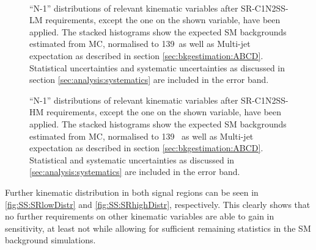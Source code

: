 \begin{figure}[!htpb]
\centering
  \\
  \caption{``N-1'' distributions of relevant kinematic variables after SR-C1N2SS-LM requirements, except the one on the
shown variable, have been applied.
The stacked histograms show the expected SM backgrounds estimated from \ac{MC}, normalised to 139~\ifb as well as Multi-jet expectation as described in section \ref{sec:bkgestimation:ABCD}.
\label{fig:SS:SRlowmass}Statistical uncertainties and systematic uncertainties as discussed in section \ref{sec:analysis:systematics} are included in the error band. }
\end{figure}

\begin{figure}[!htpb]
\centering
{}
  \caption{``N-1'' distributions of relevant kinematic variables after SR-C1N2SS-HM requirements, except the one on the
shown variable, have been applied. The stacked histograms show the expected \ac{SM} backgrounds estimated from \ac{MC}, normalised to 139 ~\ifb as well as Multi-jet expectation as described in section \ref{sec:bkgestimation:ABCD}. Statistical and systematic uncertainties as discussed in \ref{sec:analysis:systematics} are included in the error band. 
\label{fig:SS:SRhighmass} }
\end{figure}

Further kinematic distribution in both signal regions can be seen in \ref{fig:SS:SRlowDistr} and \ref{fig:SS:SRhighDistr}, respectively. This clearly shows that no further requirements on other kinematic variables are able to gain in sensitivity,  at least not while allowing for sufficient remaining statistics in the \ac{SM} background simulations.

